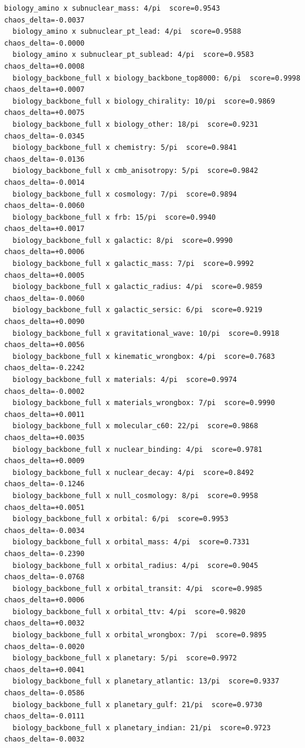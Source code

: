 \documentclass[11pt, letterpaper, openany]{book}
\begin{document}
\begin{empiricalbox}
\begin{lstlisting}[style=terminal]
  biology_amino x subnuclear_mass: 4/pi  score=0.9543  chaos_delta=-0.0037
  biology_amino x subnuclear_pt_lead: 4/pi  score=0.9588  chaos_delta=-0.0000
  biology_amino x subnuclear_pt_sublead: 4/pi  score=0.9583  chaos_delta=+0.0008
  biology_backbone_full x biology_backbone_top8000: 6/pi  score=0.9998  chaos_delta=+0.0007
  biology_backbone_full x biology_chirality: 10/pi  score=0.9869  chaos_delta=+0.0075
  biology_backbone_full x biology_other: 18/pi  score=0.9231  chaos_delta=-0.0345
  biology_backbone_full x chemistry: 5/pi  score=0.9841  chaos_delta=-0.0136
  biology_backbone_full x cmb_anisotropy: 5/pi  score=0.9842  chaos_delta=-0.0014
  biology_backbone_full x cosmology: 7/pi  score=0.9894  chaos_delta=-0.0060
  biology_backbone_full x frb: 15/pi  score=0.9940  chaos_delta=+0.0017
  biology_backbone_full x galactic: 8/pi  score=0.9990  chaos_delta=+0.0006
  biology_backbone_full x galactic_mass: 7/pi  score=0.9992  chaos_delta=+0.0005
  biology_backbone_full x galactic_radius: 4/pi  score=0.9859  chaos_delta=-0.0060
  biology_backbone_full x galactic_sersic: 6/pi  score=0.9219  chaos_delta=+0.0090
  biology_backbone_full x gravitational_wave: 10/pi  score=0.9918  chaos_delta=+0.0056
  biology_backbone_full x kinematic_wrongbox: 4/pi  score=0.7683  chaos_delta=-0.2242
  biology_backbone_full x materials: 4/pi  score=0.9974  chaos_delta=-0.0002
  biology_backbone_full x materials_wrongbox: 7/pi  score=0.9990  chaos_delta=+0.0011
  biology_backbone_full x molecular_c60: 22/pi  score=0.9868  chaos_delta=+0.0035
  biology_backbone_full x nuclear_binding: 4/pi  score=0.9781  chaos_delta=+0.0009
  biology_backbone_full x nuclear_decay: 4/pi  score=0.8492  chaos_delta=-0.1246
  biology_backbone_full x null_cosmology: 8/pi  score=0.9958  chaos_delta=+0.0051
  biology_backbone_full x orbital: 6/pi  score=0.9953  chaos_delta=-0.0034
  biology_backbone_full x orbital_mass: 4/pi  score=0.7331  chaos_delta=-0.2390
  biology_backbone_full x orbital_radius: 4/pi  score=0.9045  chaos_delta=-0.0768
  biology_backbone_full x orbital_transit: 4/pi  score=0.9985  chaos_delta=+0.0006
  biology_backbone_full x orbital_ttv: 4/pi  score=0.9820  chaos_delta=+0.0032
  biology_backbone_full x orbital_wrongbox: 7/pi  score=0.9895  chaos_delta=-0.0020
  biology_backbone_full x planetary: 5/pi  score=0.9972  chaos_delta=+0.0041
  biology_backbone_full x planetary_atlantic: 13/pi  score=0.9337  chaos_delta=-0.0586
  biology_backbone_full x planetary_gulf: 21/pi  score=0.9730  chaos_delta=-0.0111
  biology_backbone_full x planetary_indian: 21/pi  score=0.9723  chaos_delta=-0.0032

\end{lstlisting}
\end{empiricalbox}
\end{document}
